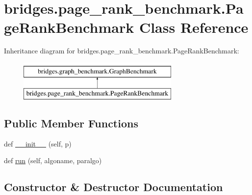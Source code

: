 \hypertarget{classbridges_1_1page__rank__benchmark_1_1_page_rank_benchmark}{}\section{bridges.\+page\+\_\+rank\+\_\+benchmark.\+Page\+Rank\+Benchmark Class Reference}
\label{classbridges_1_1page__rank__benchmark_1_1_page_rank_benchmark}
Inheritance diagram for bridges.\+page\+\_\+rank\+\_\+benchmark.\+Page\+Rank\+Benchmark\+:\begin{figure}[H]
\begin{center}
\leavevmode
\includegraphics[height=2.000000cm]{classbridges_1_1page__rank__benchmark_1_1_page_rank_benchmark}
\end{center}
\end{figure}
\subsection*{Public Member Functions}
\begin{DoxyCompactItemize}
\item 
def \mbox{\hyperlink{classbridges_1_1page__rank__benchmark_1_1_page_rank_benchmark_a2a0035c029f654ef65feab7a15a19770}{\+\_\+\+\_\+init\+\_\+\+\_\+}} (self, p)
\item 
def \mbox{\hyperlink{classbridges_1_1page__rank__benchmark_1_1_page_rank_benchmark_ab1e8da6b9ec3e3858f23bcffb42c5f6c}{run}} (self, algoname, paralgo)
\end{DoxyCompactItemize}


\subsection{Constructor \& Destructor Documentation}
\mbox{\label{classbridges_1_1page__rank__benchmark_1_1_page_rank_benchmark_a2a0035c029f654ef65feab7a15a19770}} 
